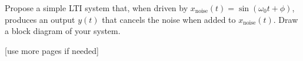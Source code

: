\documentclass{ee102_pset}
\begin{document}
\problempart{\textbf{[5 points]}}
Propose a simple LTI system that, when driven by $x_{\text{noise}}(t)=\sin(\omega_0 t+\phi)$, produces an output $y(t)$ that cancels the noise when added to $x_{\text{noise}}(t)$. Draw a block diagram of your system.









\vspace*{\fill}
\begin{center}
[use more pages if needed]
\end{center}
\end{document}
